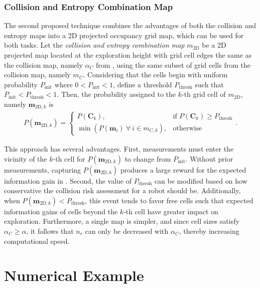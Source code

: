\subsubsection{Collision and Entropy Combination Map}
The second proposed technique combines the advantages of both the collision and entropy maps into a 2D projected occupancy grid map, which can be used for both tasks. Let the \emph{collision and entropy combination map} $ m_\text{2D}$ be a 2D projected map located at the exploration height with grid cell edges the same as the collision map, namely $\alpha_C$ from , using the same subset of grid cells from the collision map, namely $ m_C$. Considering that the cells begin with uniform probability $P_\text{init}$ where $0<P_\text{init}<1$, define a threshold $P_\text{thresh}$ such that $P_\text{init}<P_\text{thresh}<1$. Then, the probability assigned to the $k$-th grid cell of $ m_\text{2D}$, namely $\mathbf{m}_{\text{2D},k}$ is
\begin{align}
\label{eqn:CombinationProjection2DMap}
P(\mathbf{m}_{\text{2D},k})= 
\begin{cases}
    P(\mathbf{C}_k),			& \text{if }P(\mathbf{C}_k)\geq P_\text{thresh}\\
    \min{(P(\mathbf{m}_i)\ \forall \ i\in m_{C,k})},              & \text{otherwise}
\end{cases}.
\end{align}

This approach has several advantages. First, measurements must enter the vicinity of the $k$-th cell for $P(\mathbf{m}_{\text{2D},k})$ to change from $P_\text{init}$. Without prior measurements, capturing $P(\mathbf{m}_{\text{2D},k})$ produces a large reward for the expected information gain in . Second, the value of $P_\text{thresh}$ can be modified based on how conservative the collision risk assessment for a robot should be. Additionally, when $P(\mathbf{m}_{\text{2D},k})<P_\text{thresh}$, this event tends to favor free cells such that expected information gains of cells beyond the $k$-th cell have greater impact on exploration. Furthermore, a single map is simpler, and since cell sizes satisfy $\alpha_C\geq\alpha$, it follows that $n_r$ can only be decreased with $\alpha_C$, thereby increasing computational speed.

\section{Numerical Example}
\label{sec:Compare2MapProjections}

